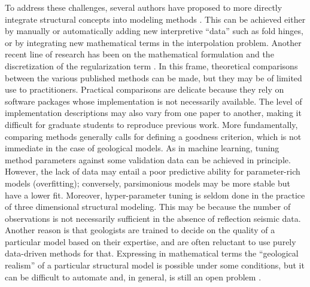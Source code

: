 \documentclass[final]{ring20}
\begin{document}
To address these challenges, several authors have proposed to more directly integrate structural concepts into modeling methods \citep{DeKemp2003G,Maxelon2009C&G,MassiotGM2010,Laurent2016EaPSL,Grose2017JSG,Grose2018JGRSE,Grose2019JoSG}. This can be achieved either by manually or automatically adding new interpretive ``data'' such as fold hinges, or by integrating new mathematical terms in the interpolation problem. Another recent line of research has been on the mathematical formulation and the discretization of the regularization term \citep{Laurent2016MG,Martin2017CG,Irakarama2018EAGE,Renaudeau2019MG}. In this frame, theoretical comparisons between the various published methods can be made, but they may be of limited use to practitioners. Practical comparisons are delicate because they rely on software packages whose implementation is not necessarily available. The level of implementation descriptions may also vary from one paper to another, making it difficult for graduate students to reproduce previous work. More fundamentally, comparing methods generally calls for defining a goodness criterion, which is not immediate in the case of geological models. As in machine learning, tuning method parameters against some validation data can be achieved in principle. However, the lack of data may entail a poor predictive ability for parameter-rich models (overfitting); conversely, parsimonious models may be more stable but have a lower fit. Moreover, hyper-parameter tuning is seldom done in the practice of three dimensional structural modeling. This may be because the number of observations is not necessarily sufficient in the absence of reflection seismic data. Another reason is that geologists are trained to decide on the quality of a particular model based on their expertise, and are often reluctant to use purely data-driven methods for that. Expressing in mathematical terms the ``geological realism'' of a particular structural model is possible under some conditions, but it can be difficult to automate and, in general, is still an open problem \citep{Caumon2010MG}. 
\end{document}
